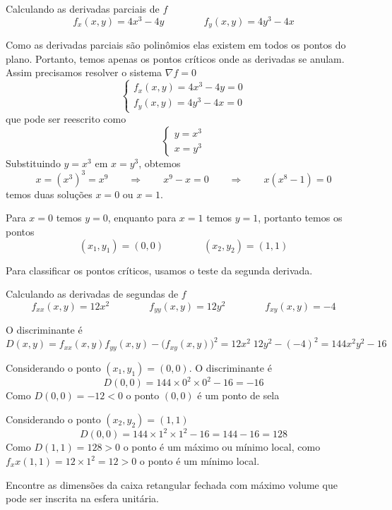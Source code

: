 \documentclass[a4paper,12pt,fleqn]{article}
\begin{document}
\begin{answer}
  Calculando as derivadas parciais de $f$
  \[
    f_x(x, y) = 4x^3 - 4y \qquad\qquad f_y(x, y) = 4y^3 - 4x
  \]

  Como as derivadas parciais são polinômios elas existem em todos os pontos
  do plano. Portanto, temos apenas os pontos críticos onde as derivadas se anulam.
  Assim precisamos resolver o sistema \(\nabla f = 0\)
  \[
    \begin{cases}
      f_x(x, y) = 4x^3 - 4y = 0 \\
      f_y(x, y) = 4y^3 - 4x = 0
    \end{cases}
  \]
  que pode ser reescrito como
  \[
    \begin{cases}
      y = x^3 \\
      x = y^3
    \end{cases}
  \]
  Substituindo \( y = x^3 \) em \( x = y^3 \), obtemos
  \[
    x = \left(x^3\right)^3 = x^9
    \qquad\Rightarrow\qquad
    x^9 - x = 0
    \qquad\Rightarrow\qquad
    x(x^8-1) = 0
  \]
  temos duas soluções \(x=0\) ou \(x=1\).

  Para $x=0$ temos \(y=0\), enquanto para $x=1$ temos \(y=1\),
  portanto temos os pontos
  \[
    (x_1, y_1) = (0, 0)
    \qquad\qquad
    (x_2, y_2) = (1, 1)
  \]

  Para classificar os pontos críticos, usamos o teste da segunda derivada.

  Calculando as derivadas de segundas de $f$
  \[
    f_{xx}(x, y) = 12x^2 \qquad\qquad
    f_{yy}(x, y) = 12y^2 \qquad\qquad
    f_{xy}(x, y) = -4
  \]

  O discriminante é
  \[
    D(x, y) = f_{xx}(x, y)f_{yy}(x, y) - \big(f_{xy}(x, y)\big)^2
    = 12x^2 \; 12y^2 - (-4)^2
    = 144 x^2 y^2 -16
  \]

  Considerando o ponto \((x_1, y_1) = (0, 0)\).
  O discriminante é
  \[
    D(0, 0)
    = 144 \times 0^2 \times 0^2 - 16
    = -16
  \]
  Como \(D(0, 0) = -12 <0\) o ponto \((0, 0)\) é um ponto de sela

  Considerando o ponto \((x_2, y_2) = (1, 1)\)
  \[
    D(0, 0)
    = 144 \times 1^2 \times 1^2 - 16
    = 144 - 16
    = 128
  \]
  Como \(D(1, 1) = 128 >0\) o ponto é um máximo ou mínimo local,
  como \( f_xx(1, 1) = 12\times 1^2 = 12> 0 \) o ponto é um mínimo local.
  \clearpage
\end{answer}

Encontre as dimensões da caixa retangular fechada com máximo volume
que pode ser inscrita na esfera unitária.
\end{document}
